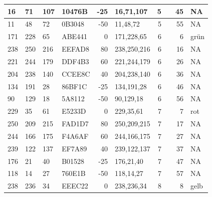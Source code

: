\documentclass[
]{article}
\begin{document}
\begin{table}
\begin{tabular}[t]{l|l|l|l|r|l|r|l|r|l}
\hline
16 & 71 & 107 & 10476B & -25 & 16,71,107 & 5 & \multicolumn{1}{c}{\cellcolor[HTML]{10476B}{\textcolor{white}{\#10476B}}} & 45 & NA\\
\hline
11 & 48 & 72 & 0B3048 & -50 & 11,48,72 & 5 & \multicolumn{1}{c}{\cellcolor[HTML]{0B3048}{\textcolor{white}{\#0B3048}}} & 55 & NA\\
\hline
171 & 228 & 65 & ABE441 & 0 & 171,228,65 & 6 & \multicolumn{1}{c}{\cellcolor[HTML]{ABE441}{\textcolor{white}{\#ABE441}}} & 6 & grün\\
\hline
238 & 250 & 216 & EEFAD8 & 80 & 238,250,216 & 6 & \multicolumn{1}{c}{\cellcolor[HTML]{EEFAD8}{\textcolor{white}{\#EEFAD8}}} & 16 & NA\\
\hline
221 & 244 & 179 & DDF4B3 & 60 & 221,244,179 & 6 & \multicolumn{1}{c}{\cellcolor[HTML]{DDF4B3}{\textcolor{white}{\#DDF4B3}}} & 26 & NA\\
\hline
204 & 238 & 140 & CCEE8C & 40 & 204,238,140 & 6 & \multicolumn{1}{c}{\cellcolor[HTML]{CCEE8C}{\textcolor{white}{\#CCEE8C}}} & 36 & NA\\
\hline
134 & 191 & 28 & 86BF1C & -25 & 134,191,28 & 6 & \multicolumn{1}{c}{\cellcolor[HTML]{86BF1C}{\textcolor{white}{\#86BF1C}}} & 46 & NA\\
\hline
90 & 129 & 18 & 5A8112 & -50 & 90,129,18 & 6 & \multicolumn{1}{c}{\cellcolor[HTML]{5A8112}{\textcolor{white}{\#5A8112}}} & 56 & NA\\
\hline
229 & 35 & 61 & E5233D & 0 & 229,35,61 & 7 & \multicolumn{1}{c}{\cellcolor[HTML]{E5233D}{\textcolor{white}{\#E5233D}}} & 7 & rot\\
\hline
250 & 209 & 215 & FAD1D7 & 80 & 250,209,215 & 7 & \multicolumn{1}{c}{\cellcolor[HTML]{FAD1D7}{\textcolor{white}{\#FAD1D7}}} & 17 & NA\\
\hline
244 & 166 & 175 & F4A6AF & 60 & 244,166,175 & 7 & \multicolumn{1}{c}{\cellcolor[HTML]{F4A6AF}{\textcolor{white}{\#F4A6AF}}} & 27 & NA\\
\hline
239 & 122 & 137 & EF7A89 & 40 & 239,122,137 & 7 & \multicolumn{1}{c}{\cellcolor[HTML]{EF7A89}{\textcolor{white}{\#EF7A89}}} & 37 & NA\\
\hline
176 & 21 & 40 & B01528 & -25 & 176,21,40 & 7 & \multicolumn{1}{c}{\cellcolor[HTML]{B01528}{\textcolor{white}{\#B01528}}} & 47 & NA\\
\hline
118 & 14 & 27 & 760E1B & -50 & 118,14,27 & 7 & \multicolumn{1}{c}{\cellcolor[HTML]{760E1B}{\textcolor{white}{\#760E1B}}} & 57 & NA\\
\hline
238 & 236 & 34 & EEEC22 & 0 & 238,236,34 & 8 & \multicolumn{1}{c}{\cellcolor[HTML]{EEEC22}{\textcolor{white}{\#EEEC22}}} & 8 & gelb\\

\end{tabular}
\end{table}
\end{document}

